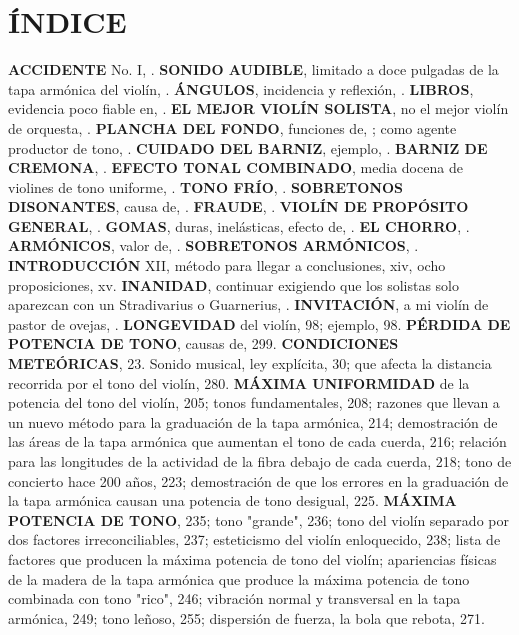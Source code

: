 \chapter*{ÍNDICE}
\begin{multicols}{2}
\textbf{ACCIDENTE} No. I, \pageref{accidente}.
\textbf{SONIDO AUDIBLE}, limitado a doce pulgadas de la tapa armónica del violín, \pageref{sonido_audible}.
\textbf{ÁNGULOS}, incidencia y reflexión, \pageref{angulos}.
\textbf{LIBROS}, evidencia poco fiable en, \pageref{libros}.
\textbf{EL MEJOR VIOLÍN SOLISTA}, no el mejor violín de orquesta, \pageref{mejor_violin}.
\textbf{PLANCHA DEL FONDO}, funciones de, \pageref{plancha_fondo}; como agente productor de tono, \pageref{plancha_tono}.
\textbf{CUIDADO DEL BARNIZ}, ejemplo, \pageref{cuidado_barniz}.
\textbf{BARNIZ DE CREMONA}, \pageref{barniz_cremona}.
\textbf{EFECTO TONAL COMBINADO}, media docena de violines de tono uniforme, \pageref{efecto_tonal}.
\textbf{TONO FRÍO}, \pageref{tono_frio}.
\textbf{SOBRETONOS DISONANTES}, causa de, \pageref{sobretonos_dis}.
\textbf{FRAUDE}, \pageref{fraude}.
\textbf{VIOLÍN DE PROPÓSITO GENERAL}, \pageref{violin_general}.
\textbf{GOMAS}, duras, inelásticas, efecto de, \pageref{gomas}.
\textbf{EL CHORRO}, \pageref{chorro}.
\textbf{ARMÓNICOS}, valor de, \pageref{armonicos}.
\textbf{SOBRETONOS ARMÓNICOS}, \pageref{sobretonos_arm}.
\textbf{INTRODUCCIÓN} XII, método para llegar a conclusiones, xiv, ocho proposiciones, xv.
\textbf{INANIDAD}, continuar exigiendo que los solistas solo aparezcan con un Stradivarius o Guarnerius, \pageref{inanidad}.
\textbf{INVITACIÓN}, a mi violín de pastor de ovejas, \pageref{invitacion}.
\textbf{LONGEVIDAD} del violín, 98; ejemplo, 98.
\textbf{PÉRDIDA DE POTENCIA DE TONO}, causas de, 299.
\textbf{CONDICIONES METEÓRICAS}, 23. Sonido musical, ley explícita, 30; que afecta la distancia recorrida por el tono del violín, 280.
\textbf{MÁXIMA UNIFORMIDAD} de la potencia del tono del violín, 205; tonos fundamentales, 208; razones que llevan a un nuevo método para la graduación de la tapa armónica, 214; demostración de las áreas de la tapa armónica que aumentan el tono de cada cuerda, 216; relación para las longitudes de la actividad de la fibra debajo de cada cuerda, 218; tono de concierto hace 200 años, 223; demostración de que los errores en la graduación de la tapa armónica causan una potencia de tono desigual, 225.
\textbf{MÁXIMA POTENCIA DE TONO}, 235; tono "grande", 236; tono del violín separado por dos factores irreconciliables, 237; esteticismo del violín enloquecido, 238; lista de factores que producen la máxima potencia de tono del violín; apariencias físicas de la madera de la tapa armónica que produce la máxima potencia de tono combinada con tono "rico", 246; vibración normal y transversal en la tapa armónica, 249; tono leñoso, 255; dispersión de fuerza, la bola que rebota, 271.

\end{multicols}
